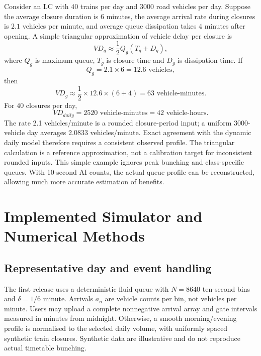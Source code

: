 \documentclass[11pt,a4paper]{article}
\begin{document}
Consider an LC with $40$ trains per day and $3000$ road vehicles per day. Suppose the average closure duration is $6$ minutes, the average arrival rate during closures is $2.1$ vehicles per minute, and average queue dissipation takes $4$ minutes after opening. A simple triangular approximation of vehicle delay per closure is
\begin{equation}
VD_g \approx \frac{1}{2}Q_g(T_g+D_g),
\end{equation}
where $Q_g$ is maximum queue, $T_g$ is closure time and $D_g$ is dissipation time. If
\begin{equation}
Q_g=2.1\times 6=12.6 \text{ vehicles},
\end{equation}
then
\begin{equation}
VD_g\approx \frac{1}{2}\times 12.6\times(6+4)=63\text{ vehicle-minutes}.
\end{equation}
For $40$ closures per day,
\begin{equation}
VD_{daily}=2520\text{ vehicle-minutes}=42\text{ vehicle-hours}.
\end{equation}
The rate 2.1 vehicles/minute is a rounded closure-period input; a uniform 3000-vehicle day averages 2.0833 vehicles/minute. Exact agreement with the dynamic daily model therefore requires a consistent observed profile. The triangular calculation is a reference approximation, not a calibration target for inconsistent rounded inputs. This simple example ignores peak bunching and class-specific queues. With 10-second AI counts, the actual queue profile can be reconstructed, allowing much more accurate estimation of benefits.


\section{Implemented Simulator and Numerical Methods}
\subsection{Representative day and event handling}
The first release uses a deterministic fluid queue with $N=8640$ ten-second bins and $\delta=1/6$ minute. Arrivals $a_n$ are vehicle counts per bin, not vehicles per minute. Users may upload a complete nonnegative arrival array and gate intervals measured in minutes from midnight. Otherwise, a smooth morning/evening profile is normalised to the selected daily volume, with uniformly spaced synthetic train closures. Synthetic data are illustrative and do not reproduce actual timetable bunching.
\end{document}
